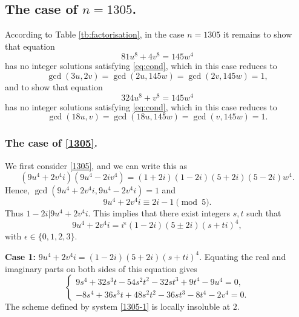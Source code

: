 \documentclass[a4paper,12pt,english,reqno]{amsart}
\begin{document}
\subsection{The case of $n=1305$.}%
According to Table \ref{tb:factorisation}, in the case $n=1305$ it remains to
show that equation
\begin{equation}\label{1305}
81u^8+4v^8=145w^4
\end{equation}
has no integer solutions satisfying \eqref{eq:cond}, which in this case reduces to \[\gcd(3u,2v)=\gcd(2u,145w)=\gcd(2v,145w)=1,\] 
and to show that equation
\begin{equation}\label{1305.2}
324 u^8 + v^8=145w^4
\end{equation}
has no integer solutions satisfying \eqref{eq:cond}, which in this case reduces to \[\gcd(18u,v)=\gcd(18u,145w)=\gcd(v,145w)=1.\] 


\subsubsection{The case of \eqref{1305}.}
We first consider \eqref{1305}, and we can write this as
\begin{equation}\label{1305.1} (9u^4+2v^4i)(9u^4-2iv^4)=(1+2i)(1-2i)(5+2i)(5-2i)w^4.
\end{equation}
Hence, $\gcd(9u^4+2v^4i,9u^4-2v^4i)=1$ and \[9u^4+2v^4i\equiv 2i-1\pmod{5}.\]
Thus $1-2i|9u^4+2v^4i$. This implies that there exist integers $s,t$ such that 
\[9u^4+2v^4i=i^{\epsilon}(1-2i)(5\pm 2i)(s+ti)^4,\]
with $\epsilon \in \{0,1,2,3\}$.


{\bf Case 1:} $9u^4+2v^4i=(1-2i)(5+2i)(s+ti)^4$. Equating the real and imaginary parts on both sides of this equation gives
\begin{equation}\label{1305-1}
\begin{cases}
9s^4 + 32s^3t -54s^2t^2 - 32st^3 + 9t^4-9u^4=0,\\
-8s^4 + 36s^3t + 48s^2t^2 - 36st^3 - 8t^4-2v^4=0.
\end{cases}
\end{equation}
The scheme defined by system \eqref{1305-1} is locally insoluble at $2$.

\end{document}
